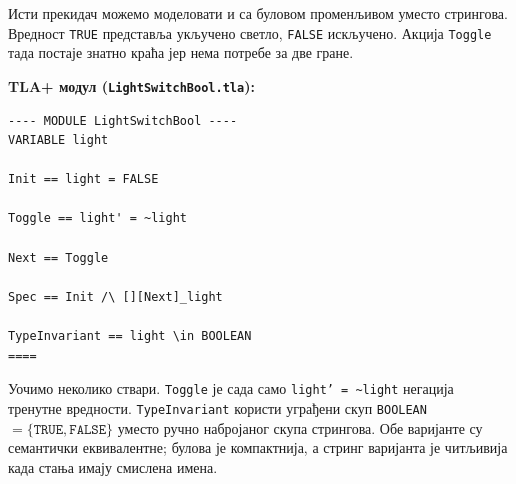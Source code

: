 \begin{primer}
Исти прекидач можемо моделовати и са буловом променљивом уместо стрингова.
Вредност \texttt{TRUE} представља укључено светло, \texttt{FALSE} искључено.
Акција \texttt{Toggle} тада постаје знатно краћа јер нема потребе за две гране.

\textbf{TLA+ модул (\texttt{LightSwitchBool.tla}):}
\begin{lstlisting}
---- MODULE LightSwitchBool ----
VARIABLE light

Init == light = FALSE

Toggle == light' = ~light

Next == Toggle

Spec == Init /\ [][Next]_light

TypeInvariant == light \in BOOLEAN
====
\end{lstlisting}

Уочимо неколико ствари. \texttt{Toggle} је сада само \texttt{light' = \textasciitilde light} негација тренутне вредности.
\texttt{TypeInvariant} користи уграђени скуп \texttt{BOOLEAN} $= \{\texttt{TRUE}, \texttt{FALSE}\}$ уместо ручно набројаног скупа стрингова.
Обе варијанте су семантички еквивалентне; булова је компактнија, а стринг варијанта је читљивија када стања имају смислена имена.
\end{primer}

